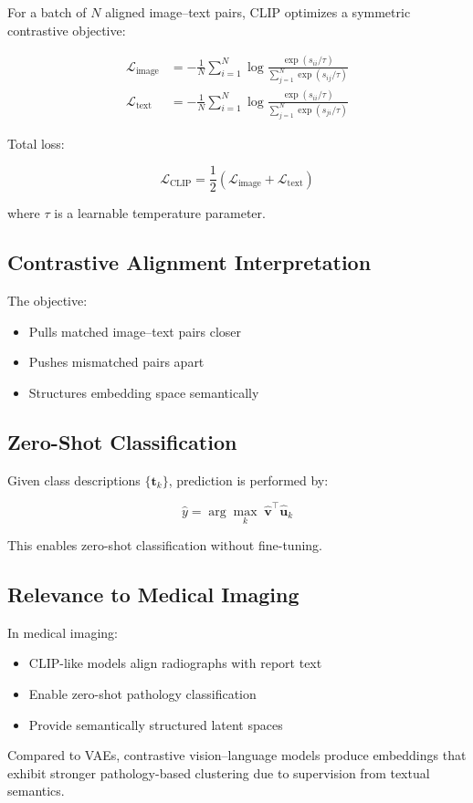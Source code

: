 For a batch of $N$ aligned image–text pairs, CLIP optimizes a symmetric contrastive objective:

\begin{align}
\mathcal{L}_{\text{image}} &=
- \frac{1}{N} \sum_{i=1}^N
\log
\frac{\exp(s_{ii}/\tau)}
{\sum_{j=1}^N \exp(s_{ij}/\tau)}
\\
\mathcal{L}_{\text{text}} &=
- \frac{1}{N} \sum_{i=1}^N
\log
\frac{\exp(s_{ii}/\tau)}
{\sum_{j=1}^N \exp(s_{ji}/\tau)}
\end{align}

Total loss:

\begin{equation}
\mathcal{L}_{\text{CLIP}} =
\frac{1}{2}
\left(
\mathcal{L}_{\text{image}} +
\mathcal{L}_{\text{text}}
\right)
\end{equation}

where $\tau$ is a learnable temperature parameter.

\subsection{Contrastive Alignment Interpretation}

The objective:

\begin{itemize}
    \item Pulls matched image–text pairs closer
    \item Pushes mismatched pairs apart
    \item Structures embedding space semantically
\end{itemize}

\subsection{Zero-Shot Classification}

Given class descriptions $\{\mathbf{t}_k\}$, prediction is performed by:

\begin{equation}
\hat{y} =
\arg\max_k
\; \hat{\mathbf{v}}^\top \hat{\mathbf{u}}_k
\end{equation}

This enables zero-shot classification without fine-tuning.

\subsection{Relevance to Medical Imaging}

In medical imaging:

\begin{itemize}
    \item CLIP-like models align radiographs with report text
    \item Enable zero-shot pathology classification
    \item Provide semantically structured latent spaces
\end{itemize}

Compared to VAEs, contrastive vision–language models produce embeddings that exhibit stronger pathology-based clustering due to supervision from textual semantics.